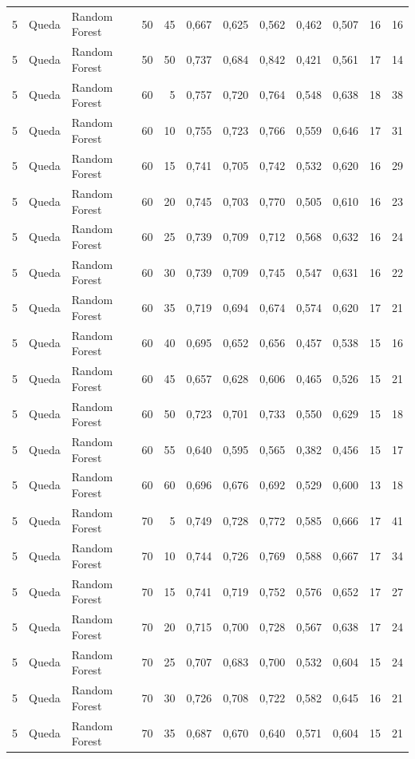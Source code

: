 \begin{longtable}{@{}rllrrrrrrrrr@{}}
5 & Queda & Random Forest & 50 & 45 & 0,667 & 0,625 & 0,562 & 0,462 & 0,507 & 16 & 16 \\
5 & Queda & Random Forest & 50 & 50 & 0,737 & 0,684 & 0,842 & 0,421 & 0,561 & 17 & 14 \\
5 & Queda & Random Forest & 60 & 5 & 0,757 & 0,720 & 0,764 & 0,548 & 0,638 & 18 & 38 \\
5 & Queda & Random Forest & 60 & 10 & 0,755 & 0,723 & 0,766 & 0,559 & 0,646 & 17 & 31 \\
5 & Queda & Random Forest & 60 & 15 & 0,741 & 0,705 & 0,742 & 0,532 & 0,620 & 16 & 29 \\
5 & Queda & Random Forest & 60 & 20 & 0,745 & 0,703 & 0,770 & 0,505 & 0,610 & 16 & 23 \\
5 & Queda & Random Forest & 60 & 25 & 0,739 & 0,709 & 0,712 & 0,568 & 0,632 & 16 & 24 \\
5 & Queda & Random Forest & 60 & 30 & 0,739 & 0,709 & 0,745 & 0,547 & 0,631 & 16 & 22 \\
5 & Queda & Random Forest & 60 & 35 & 0,719 & 0,694 & 0,674 & 0,574 & 0,620 & 17 & 21 \\
5 & Queda & Random Forest & 60 & 40 & 0,695 & 0,652 & 0,656 & 0,457 & 0,538 & 15 & 16 \\
5 & Queda & Random Forest & 60 & 45 & 0,657 & 0,628 & 0,606 & 0,465 & 0,526 & 15 & 21 \\
5 & Queda & Random Forest & 60 & 50 & 0,723 & 0,701 & 0,733 & 0,550 & 0,629 & 15 & 18 \\
5 & Queda & Random Forest & 60 & 55 & 0,640 & 0,595 & 0,565 & 0,382 & 0,456 & 15 & 17 \\
5 & Queda & Random Forest & 60 & 60 & 0,696 & 0,676 & 0,692 & 0,529 & 0,600 & 13 & 18 \\
5 & Queda & Random Forest & 70 & 5 & 0,749 & 0,728 & 0,772 & 0,585 & 0,666 & 17 & 41 \\
5 & Queda & Random Forest & 70 & 10 & 0,744 & 0,726 & 0,769 & 0,588 & 0,667 & 17 & 34 \\
5 & Queda & Random Forest & 70 & 15 & 0,741 & 0,719 & 0,752 & 0,576 & 0,652 & 17 & 27 \\
5 & Queda & Random Forest & 70 & 20 & 0,715 & 0,700 & 0,728 & 0,567 & 0,638 & 17 & 24 \\
5 & Queda & Random Forest & 70 & 25 & 0,707 & 0,683 & 0,700 & 0,532 & 0,604 & 15 & 24 \\
5 & Queda & Random Forest & 70 & 30 & 0,726 & 0,708 & 0,722 & 0,582 & 0,645 & 16 & 21 \\
5 & Queda & Random Forest & 70 & 35 & 0,687 & 0,670 & 0,640 & 0,571 & 0,604 & 15 & 21 \\

\end{longtable}
